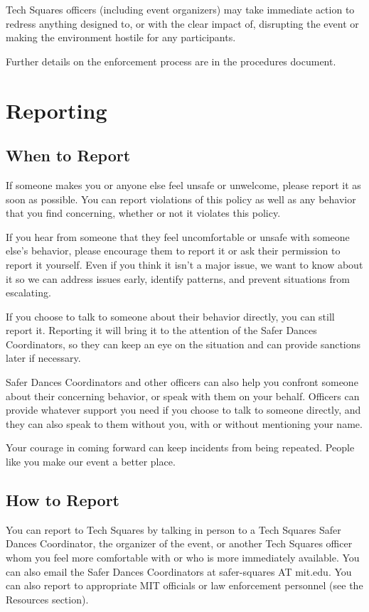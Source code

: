 \documentclass{article}
\begin{document}
Tech Squares officers (including event organizers) may take immediate action to redress anything designed to, or with the clear impact of, disrupting the event or making the environment hostile for any participants.

Further details on the enforcement process are in the procedures document.

\section{Reporting}

\subsection*{When to Report}

If someone makes you or anyone else feel unsafe or unwelcome, please report it as soon as possible. You can report violations of this policy as well as any behavior that you find concerning, whether or not it violates this policy.

If you hear from someone that they feel uncomfortable or unsafe with someone else's behavior, please encourage them to report it or ask their permission to report it yourself. Even if you think it isn't a major issue, we want to know about it so we can address issues early, identify patterns, and prevent situations from escalating.

If you choose to talk to someone about their behavior directly, you can still report it. Reporting it will bring it to the attention of the Safer Dances Coordinators, so they can keep an eye on the situation and can provide sanctions later if necessary.

Safer Dances Coordinators and other officers can also help you confront someone about their concerning behavior, or speak with them on your behalf. Officers can provide whatever support you need if you choose to talk to someone directly, and they can also speak to them without you, with or without mentioning your name.

Your courage in coming forward can keep incidents from being repeated. People like you make our event a better place.

\subsection*{How to Report}

You can report to Tech Squares by talking in person to a Tech Squares Safer Dances Coordinator, the organizer of the event, or another Tech Squares officer whom you feel more comfortable with or who is more immediately available. You can also email the Safer Dances Coordinators at safer-squares AT mit.edu. You can also report to appropriate MIT officials or law enforcement personnel (see the Resources section).
\end{document}
